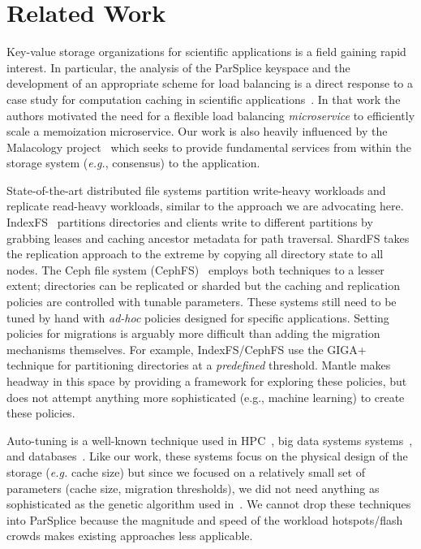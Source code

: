 \section{Related Work}

Key-value storage organizations for scientific applications is a field gaining
rapid interest. In particular, the analysis of the ParSplice keyspace and the
development of an appropriate scheme for load balancing is a direct response to
a case study for computation caching in scientific
applications~\cite{jenkins:ipdsw17-mochi}. In that work the authors motivated
the need for a flexible load balancing \emph{microservice} to efficiently scale
a memoization microservice. Our work is also heavily influenced by the
Malacology project~\cite{sevilla:eurosys17-malacology} which seeks to provide
fundamental services from within the storage system ({\it e.g.}, consensus) to
the application.

State-of-the-art distributed file systems partition write-heavy workloads and
replicate read-heavy workloads, similar to the approach we are advocating
here.  IndexFS~\cite{ren:sc2014-indexfs} partitions directories and clients
write to different partitions by grabbing leases and caching ancestor metadata
for path traversal. ShardFS takes the replication approach to the extreme by
copying all directory state to all nodes. The Ceph file system
(CephFS)~\cite{weil:sc2004-dyn-metadata, weil:osdi2006-ceph} employs both
techniques to a lesser extent; directories can be replicated or sharded but the
caching and replication policies are controlled with tunable parameters.  These
systems still need to be tuned by hand with {\it ad-hoc} policies designed for
specific applications.  Setting policies for migrations is arguably more
difficult than adding the migration mechanisms themselves.  For example,
IndexFS/CephFS use the GIGA+~\cite{patil:fast2011-giga} technique for
partitioning directories at a \emph{predefined} threshold. Mantle makes headway
in this space by providing a framework for exploring these policies, but does
not attempt anything more sophisticated (e.g., machine learning) to create
these policies. 

Auto-tuning is a well-known technique used in
HPC~\cite{behzad:sc2013-autotuning, behzad:techreport2014-io-autotuning}, big
data systems systems~\cite{herodotou_starfish_2011}, and
databases~\cite{schnaitter_index_2009}.  Like our work, these systems focus on
the physical design of the storage ({\it e.g.} cache size) but since we focused
on a relatively small set of parameters (cache size, migration thresholds), we
did not need anything as sophisticated as the genetic algorithm used
in~\cite{behzad:sc2013-autotuning}.  We cannot drop these techniques into
ParSplice because the magnitude and speed of the workload hotspots/flash crowds
makes existing approaches less applicable. 

